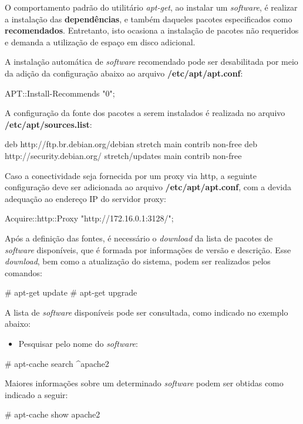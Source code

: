     O comportamento padrão do utilitário {\it apt-get}, ao instalar um
{\it software}, é realizar a instalação das {\bf dependências}, e também
daqueles pacotes especificados como {\bf recomendados}. Entretanto, isto
ocasiona a instalação de pacotes não requeridos e demanda a utilização de
espaço em disco adicional.

    A instalação automática de {\it software} recomendado pode ser
desabilitada por meio da adição da configuração abaixo ao arquivo
{\bf /etc/apt/apt.conf}:

\begin{BoxVerbatim}
APT::Install-Recommends "0";
\end{BoxVerbatim}

    A configuração da fonte dos pacotes a serem instalados é realizada
no arquivo {\bf /etc/apt/sources.list}:

\begin{BoxVerbatim}
deb http://ftp.br.debian.org/debian stretch main contrib non-free
deb http://security.debian.org/ stretch/updates main contrib non-free
\end{BoxVerbatim}

    Caso a conectividade seja fornecida por um proxy via http, a seguinte
configuração deve ser adicionada ao arquivo {\bf /etc/apt/apt.conf}, com a
devida adequação ao endereço IP do servidor proxy:

\begin{BoxVerbatim}
Acquire::http::Proxy "http://172.16.0.1:3128/";
\end{BoxVerbatim}

    Após a definição das fontes, é necessário o {\it download} da lista de
pacotes de {\it software} disponíveis, que é formada por informações de
versão e descrição. Esse {\it download}, bem como a atualização do sistema,
podem ser realizados pelos comandos:

\begin{BoxVerbatim}
    # apt-get update
    # apt-get upgrade
\end{BoxVerbatim}

    A lista de {\it software} disponíveis pode ser consultada, como indicado
no exemplo abaixo:

\begin{itemize}
\item{\bf }Pesquisar pelo nome do {\it software}:
\end{itemize}

\begin{BoxVerbatim}
    # apt-cache search ^apache2
\end{BoxVerbatim}

    Maiores informações sobre um determinado {\it software} podem ser obtidas
como indicado a seguir:

\begin{BoxVerbatim}
    # apt-cache show apache2
\end{BoxVerbatim}

